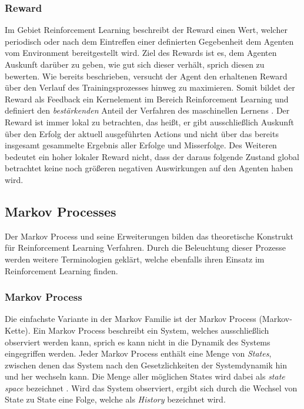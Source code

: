 \documentclass[11pt]{scrartcl}
\begin{document}
\subsubsection{Reward}
Im Gebiet Reinforcement Learning beschreibt der Reward einen Wert, welcher periodisch oder nach
dem Eintreffen einer definierten Gegebenheit dem Agenten vom Environment bereitgestellt wird.
Ziel des Rewards ist es, dem Agenten Auskunft darüber zu geben, wie gut sich dieser verhält, sprich
diesen zu bewerten. Wie bereits beschrieben, versucht der Agent den erhaltenen Reward über den
Verlauf des Trainingsprozesses hinweg zu maximieren. Somit bildet der Reward als Feedback ein
Kernelement im Bereich Reinforcement Learning und definiert den \textit{bestärkenden} Anteil der 
Verfahren des maschinellen Lernens \cite[~S.6 f.]{L2018}. Der Reward ist immer lokal zu betrachten,
das heißt, er gibt ausschließlich Auskunft über den Erfolg der aktuell ausgeführten Actions und
nicht über das bereits insgesamt gesammelte Ergebnis aller Erfolge und Misserfolge. Des Weiteren
bedeutet ein hoher lokaler Reward nicht, dass der daraus folgende Zustand global betrachtet keine
noch größeren negativen Auswirkungen auf den Agenten haben wird.


\subsection{Markov Processes}
Der Markov Process und seine Erweiterungen bilden das theoretische Konstrukt für Reinforcement Learning
Verfahren. Durch die Beleuchtung dieser Prozesse werden weitere Terminologien geklärt, welche ebenfalls
ihren Einsatz im Reinforcement Learning finden.


\subsubsection{Markov Process}
Die einfachste Variante in der Markov Familie ist der Markov Process (Markov-Kette). Ein Markov Process
beschreibt ein System, welches ausschließlich observiert werden kann, sprich es kann nicht in die Dynamik
des Systems eingegriffen werden. Jeder Markov Process enthält eine Menge von \textit{States}, zwischen
denen das System nach den Gesetzlichkeiten der Systemdynamik hin und her wechseln kann. Die Menge aller
möglichen States wird dabei als \textit{state space} bezeichnet \cite[~S.12]{L2018}. Wird das System
observiert, ergibt sich durch die Wechsel von State zu State eine Folge, welche als \textit{History}
bezeichnet wird. 
\end{document}

